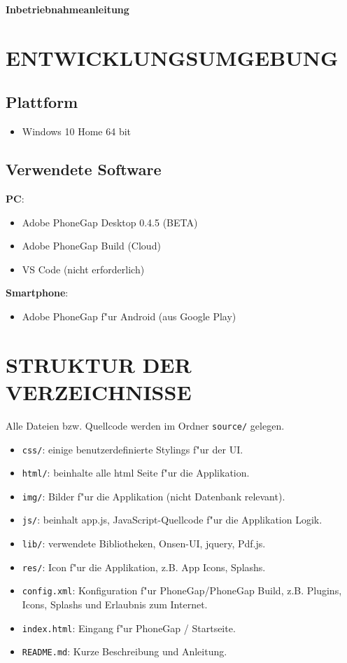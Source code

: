 \documentclass[a4paper,11pt,twoside]{article}
\begin{document}
\begin{flushleft}
	
	\Large \textbf{Inbetriebnahmeanleitung}
\end{flushleft}

\section{ENTWICKLUNGSUMGEBUNG}
\subsection{Plattform}
\begin{itemize}
	\item Windows 10 Home 64 bit
\end{itemize}
\subsection{Verwendete Software}
\textbf{PC}:
\begin{itemize}
	\item Adobe PhoneGap Desktop 0.4.5 (BETA)
	\item Adobe PhoneGap Build (Cloud)
	\item VS Code (nicht erforderlich)
\end{itemize}
\textbf{Smartphone}:
\begin{itemize}
	\item Adobe PhoneGap f"ur Android (aus Google Play)
\end{itemize}

\section{STRUKTUR DER VERZEICHNISSE}
Alle Dateien bzw. Quellcode werden im Ordner \texttt{source/} gelegen.
\begin{itemize}
	\item \texttt{css/}: einige benutzerdefinierte Stylings f"ur der UI. 
	\item \texttt{html/}: beinhalte alle html Seite f"ur die Applikation.
	\item \texttt{img/}: Bilder f"ur die Applikation (nicht Datenbank relevant).
	\item \texttt{js/}: beinhalt app.js, JavaScript-Quellcode f"ur die Applikation Logik.
	\item \texttt{lib/}: verwendete Bibliotheken, Onsen-UI, jquery, Pdf.js. 
	\item \texttt{res/}: Icon f"ur die Applikation, z.B. App Icons, Splashs.
	\item \texttt{config.xml}: Konfiguration f"ur PhoneGap/PhoneGap Build, z.B. Plugins, Icons, Splashs und Erlaubnis zum Internet.
	\item \texttt{index.html}: Eingang f"ur PhoneGap / Startseite.
	\item \texttt{README.md}: Kurze Beschreibung und Anleitung.

\end{itemize}
\end{document}
